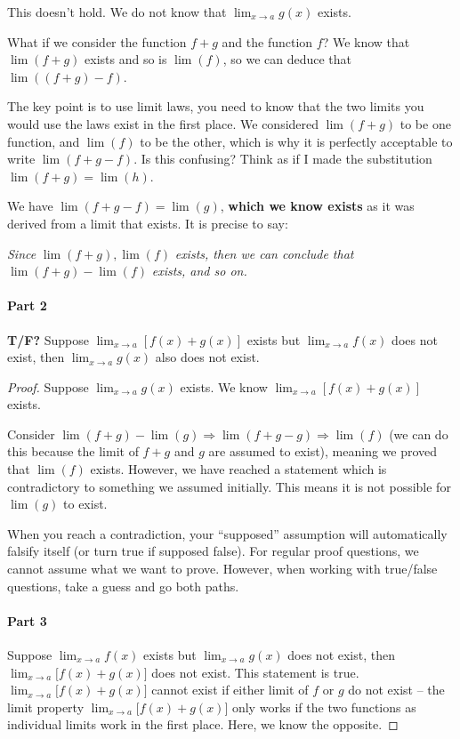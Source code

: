 \documentclass[12pt]{article}
\theoremstyle{plain}
\theoremstyle{remark}
\theoremstyle{definition}
\begin{document}
This doesn't hold. We do not know that \(\lim_{x \rightarrow a}{g(x)}\)
exists.

What if we consider the function \(f + g\) and the function \(f\)? We
know that \(\lim(f + g)\) exists and so is \(\lim(f)\), so we can deduce
that \(\lim\left( (f + g) - f \right)\).

The key point is to use limit laws, you need to know that the two limits
you would use the laws exist in the first place. We considered
\(\lim(f + g)\) to be one function, and \(\lim(f)\) to be the other,
which is why it is perfectly acceptable to write \(\lim(f + g - f)\). Is
this confusing? Think as if I made the substitution
\(\lim(f + g) = \lim(h)\).

We have \(\lim(f + g - f) = \lim(g)\), \textbf{which we know exists} as
it was derived from a limit that exists. It is precise to say:

\emph{Since} \(\lim(f + g),\lim(f)\) \emph{exists, then we can conclude
that} \(\lim(f + g) - \lim(f)\) \emph{exists, and so on.}


\paragraph{Part 2}

\textbf{T/F?} Suppose
\(\lim_{x \rightarrow a}\left\lbrack f(x) + g(x) \right\rbrack\) exists
but \(\lim_{x \rightarrow a}{f(x)}\) does not exist, then
\(\lim_{x \rightarrow a}{g(x)}\) also does not exist.

\begin{proof} Suppose \(\lim_{x \rightarrow a}{g(x)}\) exists. We know
\(\lim_{x \rightarrow a}\left\lbrack f(x) + g(x) \right\rbrack\) exists.

Consider
\(\lim(f + g) - \lim(g) \Rightarrow \lim(f + g - g) \Rightarrow \lim(f)\)
(we can do this because the limit of \(f + g\) and \(g\) are assumed to
exist), meaning we proved that \(\lim(f)\) exists. However, we have
reached a statement which is contradictory to something we assumed
initially. This means it is not possible for \(\lim(g)\) to exist.

When you reach a contradiction, your ``supposed'' assumption will
automatically falsify itself (or turn true if supposed false). For
regular proof questions, we cannot assume what we want to prove.
However, when working with true/false questions, take a guess and go
both paths.


\paragraph{Part 3}

Suppose \(\lim_{x \rightarrow a}{f(x)}\) exists but
\(\lim_{x \rightarrow a}{g(x)}\) does not exist, then
\(\lim_{x \rightarrow a}{\lbrack f(x) + g(x)\rbrack}\) does not exist.
This statement is true.
\(\lim_{x \rightarrow a}{\lbrack f(x) + g(x)\rbrack}\) cannot exist if
either limit of \(f\) or \(g\) do not exist -- the limit property
\(\lim_{x \rightarrow a}{\lbrack f(x) + g(x)\rbrack}\) only works if the
two functions as individual limits work in the first place. Here, we
know the opposite.



\end{proof}
\end{document}
